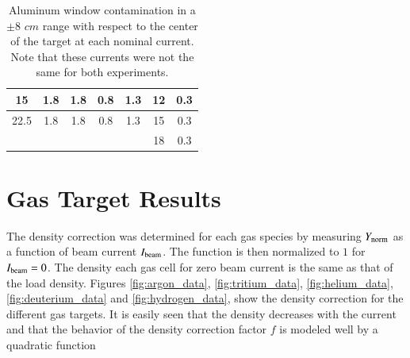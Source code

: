 \documentclass[final,5p,times,twocolumn]{elsarticle}
\begin{document}
\begin{table}[h!]
\begin{tabular}{|c|c|c|c|c|c|c|}
15                                                               & 1.8                                                             & 1.8                                                              & 0.8                                                             & 1.3                                                             & 12                                                              & 0.3                                                                                \\ \hline
22.5                                                             & 1.8                                                             & 1.8                                                              & 0.8                                                             & 1.3                                                             & 15                                                              & 0.3                                                                                \\ \hline
\multicolumn{5}{|l|}{}                                                                                                                                                                                                                                                                                                                    & 18                                                              & 0.3                                                                                \\ \hline
\end{tabular}
\caption{Aluminum window contamination in a $\pm 8$ $cm$ range with respect to the center of the target at each nominal current. Note that these currents were not the same for both experiments.}
\label{tab:contamination_al}
\end{table}

\section{Gas Target Results}

The density correction was determined for each gas species by measuring $Y_{\rm{norm}}$ as a function of beam current $I_{\rm{beam}}$. The function is then normalized to $1$ for $I_{\rm{beam}}=0$. The density each gas cell for zero beam current is the same as that of the load density. Figures  \ref{fig:argon_data}, \ref{fig:tritium_data}, \ref{fig:helium_data}, \ref{fig:deuterium_data} and \ref{fig:hydrogen_data}, show the density correction for the different gas targets. It is easily seen that the density decreases with the current and that the behavior of the density correction factor $f$ is modeled well by a quadratic function
\end{document}
